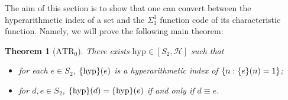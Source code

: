 \documentclass[11pt]{article}
\theoremstyle{plain}
\newtheorem{theorem}{Theorem}[section]
\theoremstyle{definition}
\begin{document}
The aim of this section is to show that one can convert between the hyperarithmetic index of a set and the $\Sigma^1_1$ function code of its characteristic function. Namely, we will prove the following main theorem:

\begin{theorem}[$\mathrm{ATR}_0$]
    \label{thm:conv-s2-to-hyp}
    There exists $\mathrm{hyp} \in \left[S_2, \mathcal{H}\right]$ such that
    \begin{itemize}
        \item for each $e \in S_2$, $\mleft\{\mathrm{hyp}\mright\}\mleft(e\mright)$ is a hyperarithmetic index of $\left\{n : \mleft\{e\mright\}\mleft(n\mright) = 1\right\}$;
        \item for $d, e \in S_2$, $\mleft\{\mathrm{hyp}\mright\}\mleft(d\mright) = \mleft\{\mathrm{hyp}\mright\}\mleft(e\mright)$ if and only if $d \equiv e$.
    \end{itemize}
\end{theorem}
\end{document}
